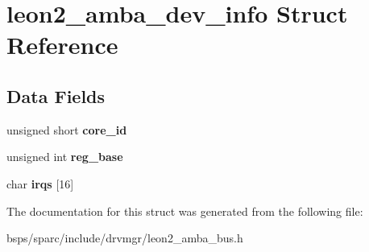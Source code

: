 \hypertarget{structleon2__amba__dev__info}{}\section{leon2\+\_\+amba\+\_\+dev\+\_\+info Struct Reference}
\label{structleon2__amba__dev__info}
\subsection*{Data Fields}
\begin{DoxyCompactItemize}
\item 
\mbox{\label{structleon2__amba__dev__info_ae8e60a5674afdd35336c2ecbfc6878ca}} 
unsigned short {\bfseries core\+\_\+id}
\item 
\mbox{\label{structleon2__amba__dev__info_a683a0b1d7ee75f27bf6cc0bdf2cb0c68}} 
unsigned int {\bfseries reg\+\_\+base}
\item 
\mbox{\label{structleon2__amba__dev__info_ab3a9af0d6ba73541a1fabc3019b52eeb}} 
char {\bfseries irqs} \mbox{[}16\mbox{]}
\end{DoxyCompactItemize}


The documentation for this struct was generated from the following file\+:\begin{DoxyCompactItemize}
\item 
bsps/sparc/include/drvmgr/leon2\+\_\+amba\+\_\+bus.\+h\end{DoxyCompactItemize}
